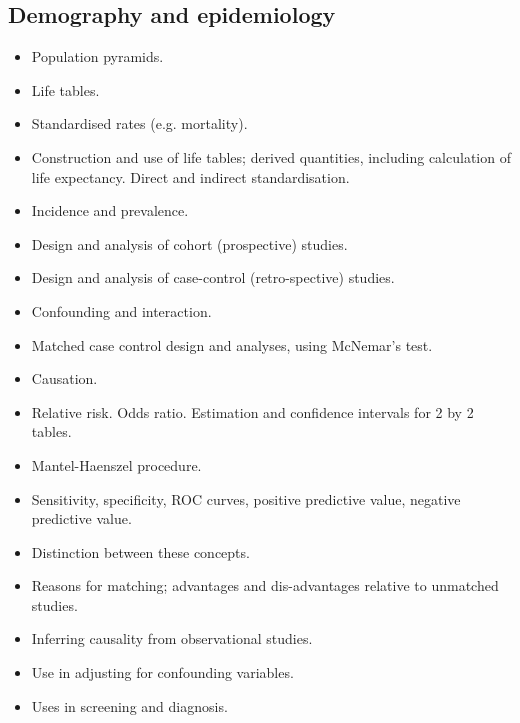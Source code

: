 \subsection*{Demography and epidemiology}
\begin{itemize}
\item	Population pyramids.
\item	Life tables.
\item	Standardised rates (e.g. mortality).
\item	Construction and use of life tables; derived quantities, including calculation of life expectancy. Direct and indirect standardisation.
\item	Incidence and prevalence.
\item	Design and analysis of cohort (prospective) studies.
\item	Design and analysis of case-control (retro-spective) studies.
\item	Confounding and interaction.
\item	Matched case control design and analyses, using McNemar's test.
\item	Causation.
\item	Relative risk. Odds ratio. Estimation and confidence intervals for 2 by 2 tables.
\item	Mantel-Haenszel procedure.
\item	Sensitivity, specificity, ROC curves, positive predictive value, negative predictive value.
\item	Distinction between these concepts.
\item	Reasons for matching; advantages and dis-advantages relative to unmatched studies.
\item	Inferring causality from observational studies.
\item	Use in adjusting for confounding variables.
\item	Uses in screening and diagnosis.
\end{itemize}
